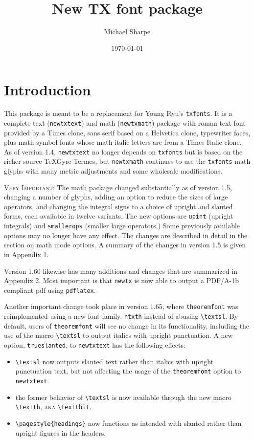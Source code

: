 \documentclass[\fsc]{article}
\title{New TX font package}
\author{Michael Sharpe}
\date{\today}  %
\theoremstyle{oldplain}
\theoremstyle{plain}
\begin{document}
\maketitle
%
\section{Introduction}
This package is meant to be a replacement for Young Ryu's {\tt txfonts}. It is  a complete text ({\tt newtxtext}) and math ({\tt newtxmath}) package with roman text font provided by  a Times clone, sans serif based on a \textsf{Helvetica} clone, typewriter faces, plus math symbol fonts whose math italic letters are from a Times Italic clone. As of version 1.4, {\tt newtxtext} no longer depends on {\tt txfonts} but is based on the richer source \textsf{TeXGyre Termes}, but {\tt newtxmath} continues to use the {\tt txfonts} math glyphs with many metric adjustments and some wholesale modifications.

\textsc{Very Important:} The math package changed substantially as of version 1.5, changing a number of glyphs, adding an option to reduce the sizes of large operators, and changing the integral signs to a choice of upright and slanted forms, each available in twelve variants. The new options are {\tt upint} (upright integrals) and {\tt smallerops} (smaller large operators.) Some previously available options may no longer have any effect. The changes are described in detail in the section on math mode options. A summary of the changes in version 1.5 is given in  Appendix 1. 

Version 1.60 likewise has many additions and changes that are summarized in Appendix 2. Most important is that {\tt newtx} is now able to output a PDF/A-1b compliant pdf using {\tt pdflatex}.

Another important change took place in version 1.65, where  {\tt theoremfont} was reimplemented using a new font family, {\tt ntxth} instead of abusing \verb|\textsl|. By default,  users of {\tt theoremfont} will see no change in its functionality, including the use of the macro \verb|\textsl| to output italics with upright punctuation. A new option, {\tt trueslanted}, to {\tt newtxtext} has the following effects:
\begin{itemize}
\item
\verb|\textsl| now outputs slanted text rather than italics with upright punctuation text, but not affecting the usage of the {\tt theoremfont} option to {\tt newtxtext}.
\item the former behavior of \verb|\textsl| is now available through the new macro \verb|\textth|, \textsc{aka} \verb|\textthit|.
\item \verb|\pagestyle{headings}| now functions as intended with slanted rather than upright figures in the headers.
\end{itemize}
\end{document}
